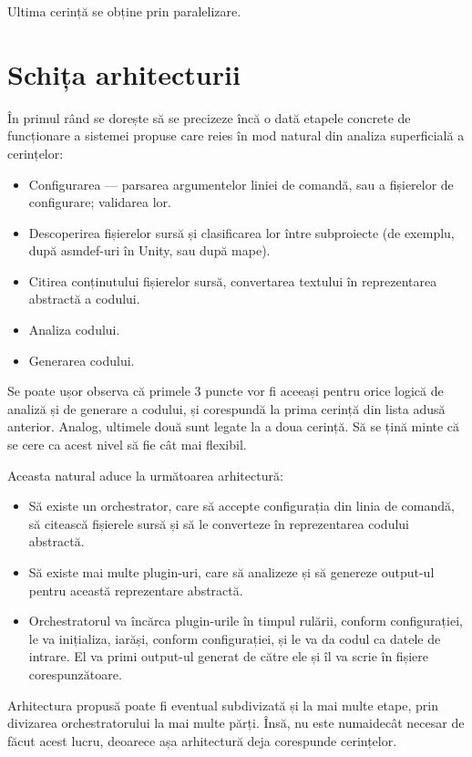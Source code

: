 \documentclass{report}
\begin{document}
Ultima cerință se obține prin paralelizare.

\section{Schița arhitecturii}

În primul rând se dorește să se precizeze încă o dată etapele concrete de funcționare a sistemei propuse care reies în mod natural din analiza superficială a cerințelor:

\begin{itemize}
\item Configurarea --- parsarea argumentelor liniei de comandă, sau a fișierelor de configurare; validarea lor.
\item Descoperirea fișierelor sursă și clasificarea lor între subproiecte (de exemplu, după asmdef-uri în Unity, sau după mape).
\item Citirea conținutului fișierelor sursă, convertarea textului în reprezentarea abstractă a codului.
\item Analiza codului.
\item Generarea codului.
\end{itemize}

Se poate ușor observa că primele 3 puncte vor fi aceeași pentru orice logică de analiză și de generare a codului, și corespundă la prima cerință din lista adusă anterior.
Analog, ultimele două sunt legate la a doua cerință.
Să se țină minte că se cere ca acest nivel să fie cât mai flexibil.

Aceasta natural aduce la următoarea arhitectură:

\begin{itemize}
  \item Să existe un orchestrator, care să accepte configurația din linia de comandă, să citească fișierele sursă și să le converteze în reprezentarea codului abstractă.
  \item Să existe mai multe plugin-uri, care să analizeze și să genereze output-ul pentru această reprezentare abstractă.
  \item Orchestratorul va încărca plugin-urile în timpul rulării, conform configurației, le va inițializa, iarăși, conform configurației, și le va da codul ca datele de intrare. El va primi output-ul generat de către ele și îl va scrie în fișiere corespunzătoare.
\end{itemize}

Arhitectura propusă poate fi eventual subdivizată și la mai multe etape, prin divizarea orchestratorului la mai multe părți.
Însă, nu este numaidecât necesar de făcut acest lucru, deoarece așa arhitectură deja corespunde cerințelor.
\end{document}
